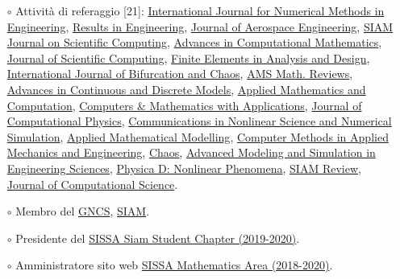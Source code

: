 \documentclass[
  usegeometry%
]{scrartcl}
\begin{document}
\begin{cv}{}
{\begin{itemize}
    \item[$\circ$] Attività di referaggio [21]: \href{https://onlinelibrary.wiley.com/journal/10970207}{ International Journal for Numerical Methods in Engineering}, \href{https://www.sciencedirect.com/journal/results-in-engineering}{Results in Engineering}, \href{https://ascelibrary.org/journal/jaeeez}{Journal of Aerospace Engineering}, \href{https://sisc.siam.org}{SIAM Journal on Scientific Computing}, \href{https://www.springer.com/journal/10444}{Advances in Computational Mathematics}, \href{https://www.springer.com/journal/10915}{Journal of Scientific Computing}, \href{https://www.sciencedirect.com/journal/finite-elements-in-analysis-and-design}{Finite Elements in Analysis and Design}, \href{https://www.worldscientific.com/worldscinet/ijbc}{International Journal of Bifurcation and Chaos}, \href{http://www.ams.org/publications/math-reviews/math-reviews}{AMS Math. Reviews}, \href{https://advancesindifferenceequations.springeropen.com}{Advances in Continuous and Discrete Models}, \href{https://www.sciencedirect.com/journal/applied-mathematics-and-computation}{Applied Mathematics and Computation}, \href{https://www.sciencedirect.com/journal/computers-and-mathematics-with-applications}{Computers \& Mathematics with Applications}, \href{https://www.sciencedirect.com/journal/journal-of-computational-physics}{Journal of Computational Physics}, \href{https://www.sciencedirect.com/journal/communications-in-nonlinear-science-and-numerical-simulation}{Communications in Nonlinear Science and Numerical Simulation}, \href{https://www.sciencedirect.com/journal/applied-mathematical-modelling}{Applied Mathematical Modelling}, \href{https://www.sciencedirect.com/journal/computer-methods-in-applied-mechanics-and-engineering}{Computer Methods in Applied Mechanics and Engineering}, \href{https://pubs.aip.org/aip/cha}{Chaos}, \href{https://amses-journal.springeropen.com}{Advanced Modeling and Simulation in Engineering Sciences}, \href{https://www.sciencedirect.com/journal/physica-d-nonlinear-phenomena}{Physica D: Nonlinear Phenomena}, \href{https://epubs.siam.org/journal/sirev}{SIAM Review}, \href{https://www.sciencedirect.com/journal/journal-of-computational-science}{Journal of Computational Science}.
    \item[$\circ$] Membro del \href{https://www.altamatematica.it/gncs/}{GNCS}, \href{https://www.siam.org}{SIAM}. %
    \item[$\circ$] Presidente del \href{http://www.math.sissa.it/content/sissa-siam-student-chapter}{SISSA Siam Student Chapter (2019-2020)}.
    \item[$\circ$] Amministratore sito web \href{https://www.math.sissa.it/content/mathematical-analysis-modelling-and-applications-0}{SISSA Mathematics Area (2018-2020)}.
\end{itemize}}


\end{cv}
\end{document}
